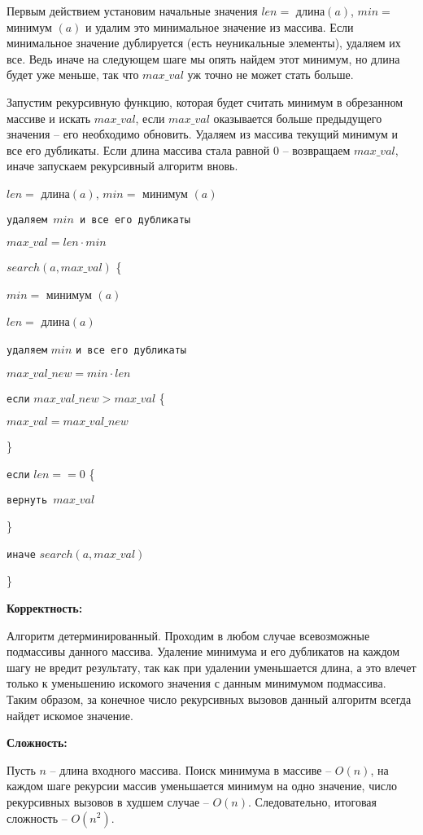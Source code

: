 \documentclass[12pt]{extreport}
\begin{document}
Первым действием установим начальные значения $len =$ длина$(a)$, $min =$ минимум $(a)$ и удалим это минимальное значение из массива. Если минимальное значение дублируется (есть неуникальные элементы), удаляем их все. Ведь иначе на следующем шаге мы опять найдем этот минимум, но длина будет уже меньше, так что $max\_val$ уж точно не может стать больше.

Запустим рекурсивную функцию, которая будет считать минимум в обрезанном массиве и искать $max\_val$, если $max\_val$ оказывается больше предыдущего значения -- его необходимо обновить. Удаляем из массива текущий минимум и все его дубликаты. Если длина массива стала равной 0 -- возвращаем $max\_val$, иначе запускаем рекурсивный алгоритм вновь. 

$len =$ длина$(a)$, $min =$ минимум $(a)$

{\tt удаляем $min$ и все его дубликаты}

$max\_val = len \cdot min$

\bigskip

$search(a, max\_val)$ \{

\hspace{4mm} $min = $ минимум $(a)$

\hspace{4mm} $len =$ длина$(a)$

\hspace{4mm} {\tt удаляем} $min$ { \tt и все его дубликаты}

\hspace{4mm} $max\_val\_new = min \cdot len $

\hspace{4mm} {\tt если} $ max\_val\_new > max\_val$ \{

\hspace{8mm} $max\_val = max\_val\_new $

\hspace{4mm}\}

\hspace{4mm} {\tt если} $len == 0$ \{

\hspace{8mm} {\tt вернуть $max\_val$}

\hspace{4mm} \}

\hspace{4mm} {\tt иначе} $search(a, max\_val)$

\}

\bigskip

{\bf Корректность:}

Алгоритм детерминированный. Проходим в любом случае всевозможные подмассивы данного массива. Удаление минимума и его дубликатов на каждом шагу не вредит результату, так как при удалении уменьшается длина, а это влечет только к уменьшению искомого значения с данным минимумом подмассива. Таким образом, за конечное число рекурсивных вызовов данный алгоритм всегда найдет искомое значение. 

\bigskip

{\bf Сложность:}

Пусть $n$ -- длина входного массива. Поиск минимума в массиве -- $O(n)$, на каждом шаге рекурсии массив уменьшается минимум на одно значение, число рекурсивных вызовов в худшем случае -- $O(n)$. Следовательно, итоговая сложность -- $O(n^2)$.
\end{document}
